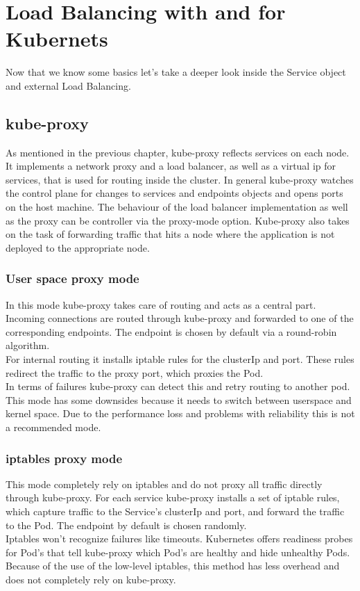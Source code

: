 \chapter{Load Balancing with and for Kubernets}

Now that we know some basics let's take a deeper look inside the Service object and external Load Balancing.

\section{kube-proxy}

As mentioned in the previous chapter, kube-proxy reflects services on each node.
It implements a network proxy and a load balancer, as well as a virtual ip for services, that is used for routing inside the cluster.
In general kube-proxy watches the control plane for changes to services and endpoints objects and opens ports on the host machine.
The behaviour of the load balancer implementation as well as the proxy can be controller via the proxy-mode option.
Kube-proxy also takes on the task of forwarding traffic that hits a node where the application is not deployed to the appropriate node.

\subsection{User space proxy mode}

In this mode kube-proxy takes care of routing and acts as a central part.
\\
Incoming connections are routed through kube-proxy and forwarded to one of the corresponding endpoints.
The endpoint is chosen by default via a round-robin algorithm.
\\
For internal routing it installs iptable rules for the clusterIp and port.
These rules redirect the traffic to the proxy port, which proxies the Pod.
\\
In terms of failures kube-proxy can detect this and retry routing to another pod.
\\
This mode has some downsides because it needs to switch between userspace and kernel space.
Due to the performance loss and problems with reliability this is not a recommended mode.

\subsection{iptables proxy mode}

This mode completely rely on iptables and do not proxy all traffic directly through kube-proxy.
For each service kube-proxy installs a set of iptable rules, which capture traffic to the Service's clusterIp and port, and forward the traffic to the Pod.
The endpoint by default is chosen randomly.
\\
Iptables won't recognize failures like timeouts.
Kubernetes offers readiness probes for Pod's that tell kube-proxy which Pod's are healthy and hide unhealthy Pods.
\\
Because of the use of the low-level iptables, this method has less overhead and does not completely rely on kube-proxy.

